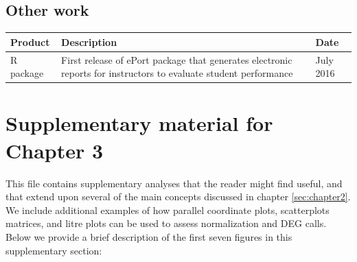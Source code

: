 \documentclass[11pt,a4paper,oldfontcommands,openany]{memoir}
\numberwithin{equation}{section} %
\begin{document}
\section{Other work}

\begin{tabular}{|p{3cm}|p{8cm}|p{3cm}|}
 \hline
 \textbf{Product} & \textbf{Description} & \textbf{Date} \\ 
 \hline
 R package & First release of ePort package that generates electronic reports for instructors to evaluate student performance & July 2016 \\
 \hline
\end{tabular}













\chapter{Supplementary material for Chapter 3}
\label{sec:suppchapter2}

This file contains supplementary analyses that the reader might find useful, and that extend upon several of the main concepts discussed in chapter \ref{sec:chapter2}. We include additional examples of how parallel coordinate plots, scatterplots matrices, and litre plots can be used to assess normalization and DEG calls. Below we provide a brief description of the first seven figures in this supplementary section:
\end{document}
